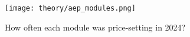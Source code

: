 \documentclass[class=scrbook, crop=false]{standalone}
\begin{document}
 \begin{figure}[ht]
            \centering
            \texttt{[image: theory/aep\_modules.png]}
             \caption[How often each module was price-setting in 2024?]{How often each module was price-setting in 2024?}
            \label{fig::aep_modules}
 \end{figure}



\ifstandalone
    \printbibliography[heading=bibintoc]                         \cleardoublepage




\fi
\end{document}
